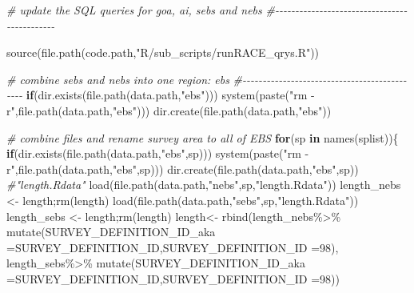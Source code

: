 \documentclass[
]{article}
\newenvironment{Shaded}{\begin{snugshade}}{\end{snugshade}}
\newcommand{\AttributeTok}[1]{\textcolor[rgb]{0.77,0.63,0.00}{#1}}
\newcommand{\CommentTok}[1]{\textcolor[rgb]{0.56,0.35,0.01}{\textit{#1}}}
\newcommand{\ControlFlowTok}[1]{\textcolor[rgb]{0.13,0.29,0.53}{\textbf{#1}}}
\newcommand{\DecValTok}[1]{\textcolor[rgb]{0.00,0.00,0.81}{#1}}
\newcommand{\FunctionTok}[1]{\textcolor[rgb]{0.00,0.00,0.00}{#1}}
\newcommand{\NormalTok}[1]{#1}
\newcommand{\OtherTok}[1]{\textcolor[rgb]{0.56,0.35,0.01}{#1}}
\newcommand{\SpecialCharTok}[1]{\textcolor[rgb]{0.00,0.00,0.00}{#1}}
\newcommand{\StringTok}[1]{\textcolor[rgb]{0.31,0.60,0.02}{#1}}
\begin{document}
\begin{Shaded}
\begin{Highlighting}[]
  \CommentTok{\# update the SQL queries for goa, ai, sebs and nebs}
  \CommentTok{\#{-}{-}{-}{-}{-}{-}{-}{-}{-}{-}{-}{-}{-}{-}{-}{-}{-}{-}{-}{-}{-}{-}{-}{-}{-}{-}{-}{-}{-}{-}{-}{-}{-}{-}{-}{-}{-}{-}{-}{-}{-}{-}{-}{-}{-}  }

  \FunctionTok{source}\NormalTok{(}\FunctionTok{file.path}\NormalTok{(code.path,}\StringTok{"R/sub\_scripts/runRACE\_qrys.R"}\NormalTok{))}

  \CommentTok{\# combine sebs and nebs into one region: ebs}
  \CommentTok{\#{-}{-}{-}{-}{-}{-}{-}{-}{-}{-}{-}{-}{-}{-}{-}{-}{-}{-}{-}{-}{-}{-}{-}{-}{-}{-}{-}{-}{-}{-}{-}{-}{-}{-}{-}{-}{-}{-}{-}{-}{-}{-}{-}{-}{-}  }
  \ControlFlowTok{if}\NormalTok{(}\FunctionTok{dir.exists}\NormalTok{(}\FunctionTok{file.path}\NormalTok{(data.path,}\StringTok{"ebs"}\NormalTok{)))}
      \FunctionTok{system}\NormalTok{(}\FunctionTok{paste}\NormalTok{(}\StringTok{"rm {-}r"}\NormalTok{,}\FunctionTok{file.path}\NormalTok{(data.path,}\StringTok{"ebs"}\NormalTok{)))}
    \FunctionTok{dir.create}\NormalTok{(}\FunctionTok{file.path}\NormalTok{(data.path,}\StringTok{"ebs"}\NormalTok{))}
  
  \CommentTok{\# combine files and rename survey area to all of EBS}
  \ControlFlowTok{for}\NormalTok{(sp }\ControlFlowTok{in} \FunctionTok{names}\NormalTok{(splist))\{}
    \ControlFlowTok{if}\NormalTok{(}\FunctionTok{dir.exists}\NormalTok{(}\FunctionTok{file.path}\NormalTok{(data.path,}\StringTok{"ebs"}\NormalTok{,sp)))}
      \FunctionTok{system}\NormalTok{(}\FunctionTok{paste}\NormalTok{(}\StringTok{"rm {-}r"}\NormalTok{,}\FunctionTok{file.path}\NormalTok{(data.path,}\StringTok{"ebs"}\NormalTok{,sp)))}
      \FunctionTok{dir.create}\NormalTok{(}\FunctionTok{file.path}\NormalTok{(data.path,}\StringTok{"ebs"}\NormalTok{,sp))}
    \CommentTok{\#"length.Rdata"         }
    \FunctionTok{load}\NormalTok{(}\FunctionTok{file.path}\NormalTok{(data.path,}\StringTok{"nebs"}\NormalTok{,sp,}\StringTok{"length.Rdata"}\NormalTok{))}
\NormalTok{    length\_nebs }\OtherTok{\textless{}{-}}\NormalTok{ length;}\FunctionTok{rm}\NormalTok{(length)}
    \FunctionTok{load}\NormalTok{(}\FunctionTok{file.path}\NormalTok{(data.path,}\StringTok{"sebs"}\NormalTok{,sp,}\StringTok{"length.Rdata"}\NormalTok{))}
\NormalTok{    length\_sebs }\OtherTok{\textless{}{-}}\NormalTok{ length;}\FunctionTok{rm}\NormalTok{(length)}
\NormalTok{    length}\OtherTok{\textless{}{-}} \FunctionTok{rbind}\NormalTok{(length\_nebs}\SpecialCharTok{\%\textgreater{}\%}
      \FunctionTok{mutate}\NormalTok{(}\AttributeTok{SURVEY\_DEFINITION\_ID\_aka =}\NormalTok{SURVEY\_DEFINITION\_ID,}\AttributeTok{SURVEY\_DEFINITION\_ID =}\DecValTok{98}\NormalTok{),}
\NormalTok{     length\_sebs}\SpecialCharTok{\%\textgreater{}\%}
      \FunctionTok{mutate}\NormalTok{(}\AttributeTok{SURVEY\_DEFINITION\_ID\_aka =}\NormalTok{SURVEY\_DEFINITION\_ID,}\AttributeTok{SURVEY\_DEFINITION\_ID =}\DecValTok{98}\NormalTok{))}
    

\end{Highlighting}
\end{Shaded}
\end{document}
